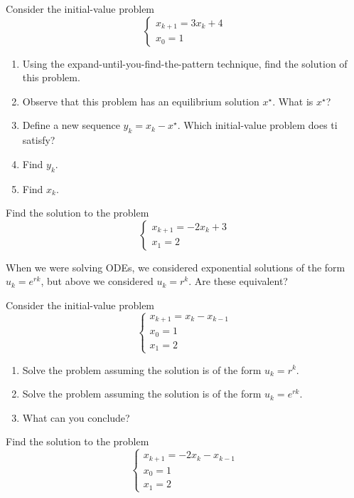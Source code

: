 \begin{exercises}

	\begin{problist}
	\prob Consider the initial-value problem
	$$ 	\begin{cases}
			 x_{k+1} = 3 x_k + 4 \\
			 x_0 = 1
 		\end{cases} $$
 	\begin{enumerate}
 		\item Using the expand-until-you-find-the-pattern technique, find the solution of this problem.
 		\item Observe that this problem has an equilibrium solution $x^\star$. What is $x^\star$?
 		\item Define a new sequence $y_k = x_k - x^\star$. Which initial-value problem does ti satisfy?
 		\item Find $y_k$.
 		\item Find $x_k$.
 	\end{enumerate}

	\prob Find the solution to the problem
	$$ 	\begin{cases}
			 x_{k+1} = -2x_{k} +3 \\
			 x_1 = 2
 		\end{cases} $$

	\prob When we were solving ODEs, we considered exponential solutions of the form $u_k = e^{rk}$, but above we considered $u_k = r^k$. Are these equivalent?
	
	Consider the initial-value problem
	$$ 	\begin{cases}
			 x_{k+1} = x_{k} - x_{k-1} \\
			 x_0 = 1 \\
			 x_1 = 2
 		\end{cases} $$

	\begin{enumerate}
		\item Solve the problem assuming the solution is of the form $u_k = r^k$.
		\item Solve the problem assuming the solution is of the form $u_k=e^{rk}$.
		\item What can you conclude?
	\end{enumerate}


	\prob Find the solution to the problem
	$$ 	\begin{cases}
			 x_{k+1} = -2x_{k} - x_{k-1} \\
			 x_0 = 1 \\
			 x_1 = 2
 		\end{cases} $$
	
	\end{problist}
\end{exercises}

